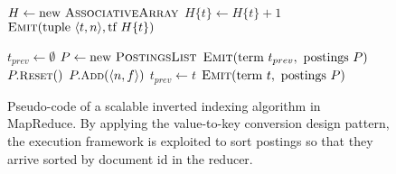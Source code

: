 \begin{figure}[t]
\algrenewcommand{}
\algrenewcommand{}
  \begin{algorithmic}[1]
    \State $H \gets \textrm{new }\textsc{AssociativeArray}$
    \State $H\{t\} \gets H\{t\} + 1$
    \EndFor
    \State $\textsc{Emit}(\textrm{tuple }\langle t, n \rangle, \textrm{tf }H\{t\} )$
    \EndFor
    \EndProcedure
    \EndFunction
  \end{algorithmic}

  \begin{algorithmic}[1]
      \State $t_{prev} \gets \emptyset$
      \State $P \gets \textrm{new }\textsc{PostingsList}$
    \EndProcedure
      \State $\textsc{Emit}(\textrm{term }t_{prev}, \textrm{ postings } P)$
      \State $P.\textsc{{\small Reset}}()$
    \EndIf
    \State $P.\textsc{{\small Add}}(\langle n, f \rangle)$
    \State $t_{prev} \gets t$
    \EndProcedure
      \State $\textsc{Emit}(\textrm{term }t, \textrm{ postings } P)$
    \EndProcedure
    \EndFunction
  \end{algorithmic}
  \caption{Pseudo-code of a scalable inverted indexing algorithm in
    MapReduce.  By applying the value-to-key conversion design
    pattern, the execution framework is exploited to sort postings so
    that they arrive sorted by document id in the reducer.}
\label{chapter-indexing:scalable}
\end{figure}

